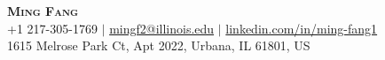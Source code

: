 \documentclass[letterpaper,11pt]{article} %
\begin{document}

% 
\begin{comment}
In Europe it is common to include a picture of ones self in the CV. Select
which heading appropriate for the document you are creating.
\end{comment}


\begin{center}
    \textbf{\Huge \scshape Ming Fang} \\ \vspace{1pt} %
    \small 
    +1 217-305-1769 $|$
    \href{mailto:mingf2@illinois.edu}{{mingf2@illinois.edu}} $|$
    \href{{https://www.linkedin.com/in/ming-fang1}}{linkedin.com/in/ming-fang1}\\ \vspace{1pt}
    {1615 Melrose Park Ct, Apt 2022, Urbana, IL 61801, US}
\end{center}
\end{document}
